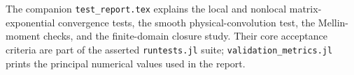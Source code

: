 \documentclass[11pt]{article}
\begin{document}
The companion \texttt{test\_report.tex} explains the local and nonlocal
matrix-exponential convergence tests, the smooth physical-convolution test,
the Mellin-moment checks, and the finite-domain closure study. Their core
acceptance criteria are part of the asserted \texttt{runtests.jl} suite;
\texttt{validation\_metrics.jl} prints the principal numerical values used in
the report.
\end{document}
